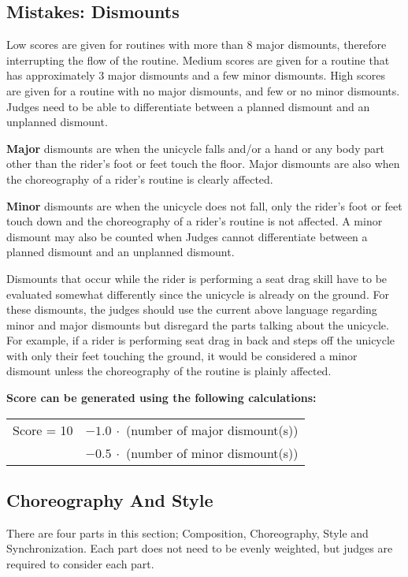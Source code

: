 \subsection{Mistakes: Dismounts}
Low scores are given for routines with more than 8 major dismounts, therefore interrupting the flow of the routine.
Medium scores are given for a routine that has approximately 3 major dismounts and a few minor dismounts.
High scores are given for a routine with no major dismounts, and few or no minor dismounts.
Judges need to be able to differentiate between a planned dismount and an unplanned dismount.

\textbf{Major} dismounts are when the unicycle falls and/or a hand or any body part other than the rider's foot or feet touch the floor.
Major dismounts are also when the choreography of a rider's routine is clearly affected.

\textbf{Minor} dismounts are when the unicycle does not fall, only the rider's foot or feet touch down and the choreography of a rider's routine is not affected.
A minor dismount may also be counted when Judges cannot differentiate between a planned dismount and an unplanned dismount.

Dismounts that occur while the rider is performing a seat drag skill have to be evaluated somewhat differently since the unicycle is already on the ground.
For these dismounts, the judges should use the current above language regarding minor and major dismounts but disregard the parts talking about the unicycle.
For example, if a rider is performing seat drag in back and steps off the unicycle with only their feet touching the ground, it would be considered a minor dismount unless the choreography of the routine is plainly affected.

\textbf{Score can be generated using the following calculations:}

\begin{tabular}{r l}
Score = 10 & $- 1.0\ \cdot$ (number of major dismount(s)) \\
 & $- 0.5\ \cdot$ (number of minor dismount(s)) \\
\end{tabular}


\subsection{Choreography And Style \label{subsec:freestyle_individual-presentation-score_choreography-style}}
There are four parts in this section; Composition, Choreography, Style and Synchronization.
Each part does not need to be evenly weighted, but judges are required to consider each part.

